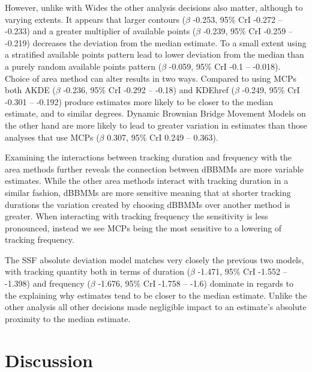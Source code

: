 \documentclass[10pt,a4paper]{article}
\begin{document}
However, unlike with Wides the other analysis decisions also matter, although to varying extents.
It appears that larger contours (\(\beta\) -0.253, 95\% CrI -0.272 -- -0.233) and a greater multiplier of available points (\(\beta\) -0.239, 95\% CrI -0.259 -- -0.219) decreases the deviation from the median estimate.
To a small extent using a stratified available points pattern lead to lower deviation from the median than a purely random available points pattern (\(\beta\) -0.059, 95\% CrI -0.1 -- -0.018).
Choice of area method can alter results in two ways.
Compared to using MCPs both AKDE (\(\beta\) -0.236, 95\% CrI -0.292 -- -0.18) and KDEhref (\(\beta\) -0.249, 95\% CrI -0.301 -- -0.192) produce estimates more likely to be closer to the median estimate, and to similar degrees.
Dynamic Brownian Bridge Movement Models on the other hand are more likely to lead to greater variation in estimates than those analyses that use MCPs (\(\beta\) 0.307, 95\% CrI 0.249 -- 0.363).

Examining the interactions between tracking duration and frequency with the area methods further reveals the connection between dBBMMs are more variable estimates.
While the other area methods interact with tracking duration in a similar fashion, dBBMMs are more sensitive meaning that at shorter tracking durations the variation created by choosing dBBMMs over another method is greater.
When interacting with tracking frequency the sensitivity is less pronounced, instead we see MCPs being the most sensitive to a lowering of tracking frequency.

The SSF absolute deviation model matches very closely the previous two models, with tracking quantity both in terms of duration (\(\beta\) -1.471, 95\% CrI -1.552 -- -1.398) and frequency (\(\beta\) -1.676, 95\% CrI -1.758 -- -1.6) dominate in regards to the explaining why estimates tend to be closer to the median estimate.
Unlike the other analysis all other decisions made negligible impact to an estimate's absolute proximity to the median estimate.

\hypertarget{discussion}{%
\section{Discussion}\label{discussion}}
\end{document}
